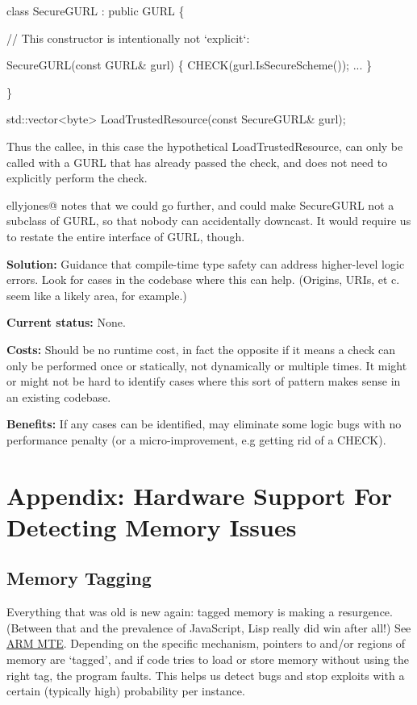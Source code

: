 \documentclass[a4paper,12pt,notitlepage,twoside,openright]{article}
\begin{document}
{class SecureGURL : public GURL \{

  // This constructor is intentionally not `explicit`:

  SecureGURL(const GURL\& gurl) \{ CHECK(gurl.IsSecureScheme()); ... \}

\}



std::vector\textless byte\textgreater{} LoadTrustedResource(const
SecureGURL\& gurl);

Thus the callee, in this case the hypothetical LoadTrustedResource, can
only be called with a GURL that has already passed the check, and does
not need to explicitly perform the check.

ellyjones@ notes that we could go further, and  could
make SecureGURL not a subclass of GURL, so that nobody can accidentally
downcast. It would require us to restate the entire interface of GURL,
though.

\textbf{Solution:} Guidance that compile-time type safety can address
higher-level logic errors. Look for cases in the codebase where this can
help. (Origins, URIs, et c. seem like a likely area, for example.)

\textbf{Current status:} None.

\textbf{Costs:} Should be no runtime cost, in fact the opposite if it
means a check can only be performed once or statically, not dynamically
or multiple times. It might or might not be hard to identify cases where
this sort of pattern makes sense in an existing codebase.

\textbf{Benefits:} If any cases can be identified, may eliminate some
logic bugs with no performance penalty (or a micro-improvement, e.g
getting rid of a CHECK).

\section{Appendix: Hardware Support For Detecting Memory Issues}

\subsection{Memory Tagging}

Everything that was old is new again: tagged memory is making a
resurgence. (Between that and the prevalence of JavaScript, Lisp really
did win after all!)
See \href{https://www.google.com/url?q=https://docs.google.com/document/d/1j7S5EZeXesdL2eLC5D6dTAbF8Us9QNUcxAhD9cmWKMg/edit\&sa=D\&source=editors\&ust=1631944129117000\&usg=AOvVaw3aB5nf-FezD0eUwLuRjhjI}{ARM
MTE}. Depending on the specific mechanism, pointers to and/or regions
of memory are `tagged', and if code tries to load or store memory
without using the right tag, the program faults. This helps us detect
bugs and stop exploits with a certain (typically high) probability per
instance.

}
\end{document}
